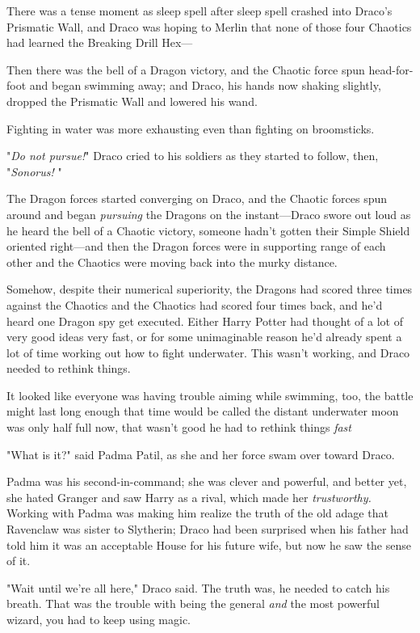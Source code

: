 There was a tense moment as sleep spell after sleep spell crashed into Draco's
Prismatic Wall, and Draco was hoping to Merlin that none of those four Chaotics
had learned the Breaking Drill Hex---

Then there was the bell of a Dragon victory, and the Chaotic force spun
head-for-foot and began swimming away; and Draco, his hands now shaking
slightly, dropped the Prismatic Wall and lowered his wand.

Fighting in water was more exhausting even than fighting on broomsticks.

"\emph{Do not pursue!}" Draco cried to his soldiers as they started to follow,
then, "\emph{Sonorus! }"

The Dragon forces started converging on Draco, and the Chaotic forces spun
around and began \emph{pursuing} the Dragons on the instant---Draco swore out
loud as he heard the bell of a Chaotic victory, someone hadn't gotten their
Simple Shield oriented right---and then the Dragon forces were in supporting
range of each other and the Chaotics were moving back into the murky distance.

Somehow, despite their numerical superiority, the Dragons had scored three
times against the Chaotics and the Chaotics had scored four times back, and
he'd heard one Dragon spy get executed. Either Harry Potter had thought of a
lot of very good ideas very fast, or for some unimaginable reason he'd already
spent a lot of time working out how to fight underwater. This wasn't working,
and Draco needed to rethink things.

It looked like everyone was having trouble aiming while swimming, too, the
battle might last long enough that time would be called{\el} the distant
underwater moon was only half full now, that wasn't good{\el} he had to
rethink things \emph{fast{\el}}

"What is it?" said Padma Patil, as she and her force swam over toward Draco.

Padma was his second-in-command; she was clever and powerful, and better yet,
she hated Granger and saw Harry as a rival, which made her \emph{trustworthy.}
Working with Padma was making him realize the truth of the old adage that
Ravenclaw was sister to Slytherin; Draco had been surprised when his father had
told him it was an acceptable House for his future wife, but now he saw the
sense of it.

"Wait until we're all here," Draco said. The truth was, he needed to catch his
breath. That was the trouble with being the general \emph{and} the most
powerful wizard, you had to keep using magic.

